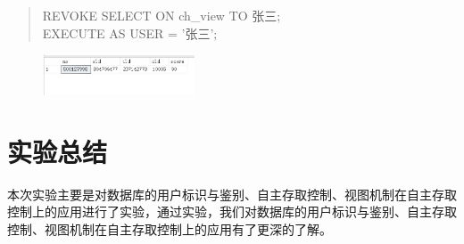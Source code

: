 \documentclass[a4paper,twoside]{article}
\begin{document}
\begin{spacing}{1.2}
\begin{enumerate}
\begin{quote}
{REVOKE SELECT ON ch\_view TO 张三;\\
EXECUTE AS USER = '张三';\\
  }
\end{quote}
\begin{figure}[htb]
  \centering
  \includegraphics[width=0.4\textwidth]{19.png}
\end{figure}
\end{enumerate}

\section{实验总结}

本次实验主要是对数据库的用户标识与鉴别、自主存取控制、视图机制在自主存取控制上的应用进行了实验，通过实验，我们对数据库的用户标识与鉴别、自主存取控制、视图机制在自主存取控制上的应用有了更深的了解。

\end{spacing}
\end{document}
